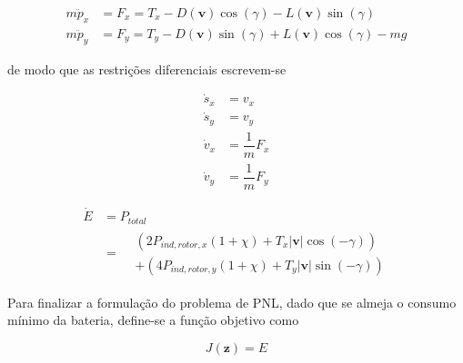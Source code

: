 \begin{equation}
\begin{aligned}
    m\ddot{p}_x &= F_x = T_x - D(\mathbf{v}) \cos(\gamma) - L(\mathbf{v}) \sin(\gamma) \\
    m\ddot{p}_y &= F_y = T_y - D(\mathbf{v}) \sin(\gamma) + L(\mathbf{v}) \cos(\gamma) - mg
\end{aligned}
\end{equation}

\noindent de modo que as restrições diferenciais escrevem-se

\begin{equation}
\begin{aligned}
    \dot{s}_x &= v_x \\
    \dot{s}_y &= v_y \\
    \dot{v}_x &= \dfrac{1}{m} F_x \\
    \dot{v}_y &= \dfrac{1}{m} F_y
\end{aligned}
\end{equation}

\begin{equation}
\begin{aligned}
    \dot{E}
    &= P_{total} \\
    &=
    \begin{aligned}
        &\left( 2 P_{ind,rotor,x} (1 + \chi) + T_x |\mathbf{v}| \cos(-\gamma) \right) \\
        &+ \left( 4 P_{ind,rotor,y} (1 + \chi) + T_y |\mathbf{v}| \sin(-\gamma) \right)
    \end{aligned}
\end{aligned}
\end{equation}

Para finalizar a formulação do problema de PNL, dado que se almeja o consumo mínimo da bateria, define-se a função objetivo como

\begin{equation}
    J(\mathbf{z}) = E
\end{equation}

